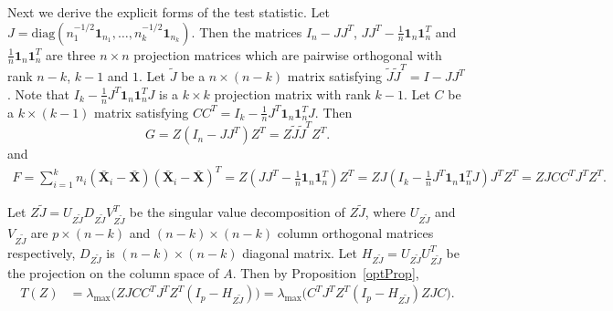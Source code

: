 \documentclass[review]{elsarticle}
\theoremstyle{plain}
\theoremstyle{definition}
\theoremstyle{remark}
\begin{document}
Next we derive the explicit forms of the test statistic. 
Let $J=\mathrm{diag}(n_1^{-1/2}\mathbf{1}_{n_1},\ldots,n_k^{-1/2}\mathbf{1}_{n_k})$.
Then the matrices $I_n-JJ^T$, $JJ^T-\frac{1}{n}\mathbf{1}_n\mathbf{1}_n^T$ and $\frac{1}{n}\mathbf{1}_n\mathbf{1}_n^T$ are three $n\times n$ projection matrices which are pairwise orthogonal with rank $n-k$, $k-1$ and $1$.
Let $\tilde{J}$ be a $n\times (n-k)$ matrix satisfying $\tilde{J}\tilde{J}^T =I-JJ^T$.
Note that $I_k-\frac{1}{n}J^T\mathbf{1}_n \mathbf{1}_n^T J$ is a $k\times k$ projection matrix with rank $k-1$.
Let $C$ be a $k\times (k-1)$ matrix satisfying $CC^T=I_k-\frac{1}{n}J^T\mathbf{1}_n \mathbf{1}_n^T J$.
Then 
$$
G=Z(I_n-JJ^T)Z^T=
Z\tilde{J}\tilde{J}^T Z^T.
$$
and
\begin{equation*}
    \begin{aligned}
        F=\sum_{i=1}^k n_i (\bar{\mathbf{X}}_i-\bar{\mathbf{X}})(\bar{\mathbf{X}}_i-\bar{\mathbf{X}})^T 
        =Z(JJ^T-\frac{1}{n}\mathbf{1}_n\mathbf{1}_n^T)Z^T
=ZJ(I_k-\frac{1}{n}J^T\mathbf{1}_n \mathbf{1}_n^T J)J^T Z^T
=ZJC C^T J^T Z^T.
    \end{aligned}
\end{equation*}

Let $Z\tilde{J}=U_{Z\tilde{J}}D_{Z\tilde{J}}V_{Z\tilde{J}}^T$ be the singular value decomposition of $Z\tilde{J}$, where $U_{Z\tilde{J}}$ and $V_{Z\tilde{J}}$ are $p\times (n-k)$ and $(n-k)\times(n-k)$ column orthogonal matrices respectively, $D_{Z\tilde{J}}$ is $(n-k)\times (n-k)$ diagonal matrix.
Let $H_{Z\tilde{J}}=U_{Z\tilde{J}}U_{Z\tilde{J}}^T$ be the projection on the column space of $A$.
Then by Proposition~\ref{optProp}, 
\begin{equation}\label{statisticForm1}
\begin{aligned}
    T(Z)&=\lambda_{\max}\big(ZJCC^TJ^TZ^T (I_p-
    H_{Z\tilde{J}})
    \big)
    =\lambda_{\max}\big(C^TJ^TZ^T (I_p-
    H_{Z\tilde{J}}
    )ZJC\big).
\end{aligned}
\end{equation}
\end{document}
